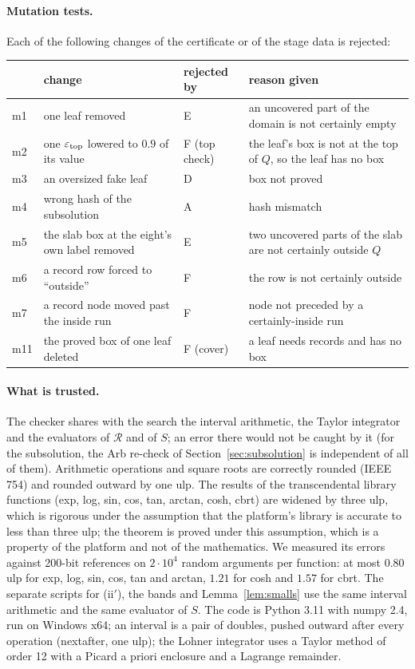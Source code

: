 \documentclass[11pt]{article}
\theoremstyle{definition}
\begin{document}
\paragraph{Mutation tests.} Each of the following changes of the certificate or of the stage data is rejected:
\begin{center}\footnotesize
\begin{tabular}{@{}lp{}lp{}@{}}\toprule
& change & rejected by & reason given \\ \midrule
m1 & one leaf removed & E & an uncovered part of the domain is not certainly empty \\
m2 & one $\varepsilon_{\rm top}$ lowered to $0.9$ of its value & F (top check) & the leaf's box is not at the top of $Q$, so the leaf has no box \\
m3 & an oversized fake leaf & D & box not proved \\
m4 & wrong hash of the subsolution & A & hash mismatch \\
m5 & the slab box at the eight's own label removed & E & two uncovered parts of the slab are not certainly outside $Q$ \\
m6 & a record row forced to ``outside'' & F & the row is not certainly outside \\
m7 & a record node moved past the inside run & F & node not preceded by a certainly-inside run \\
m11 & the proved box of one leaf deleted & F (cover) & a leaf needs records and has no box \\ \bottomrule
\end{tabular}
\end{center}

\paragraph{What is trusted.} The checker shares with the search the interval arithmetic, the Taylor integrator and the
evaluators of $\mathcal R$ and of $S$; an error there would not be caught by it (for the subsolution, the Arb re-check
of Section~\ref{sec:subsolution} is independent of all of them). Arithmetic operations and square roots are correctly
rounded (IEEE 754) and rounded outward by one ulp. The results of the transcendental library functions (exp, log, sin,
cos, tan, arctan, cosh, cbrt) are widened by three ulp, which is rigorous under the assumption that the platform's
library is accurate to less than three ulp; the theorem is proved under this assumption, which is a property of the
platform and not of the mathematics. We measured its errors against 200-bit references on $2\cdot10^4$ random
arguments per function: at most $0.80$ ulp for exp, log, sin, cos, tan and arctan, $1.21$ for cosh and $1.57$ for cbrt.
The separate scripts for (ii$'$), the bands and Lemma~\ref{lem:smalls} use the same interval arithmetic and the same
evaluator of $S$. The code is Python 3.11 with numpy 2.4, run on Windows x64; an interval is a pair of doubles, pushed
outward after every operation (nextafter, one ulp); the Lohner integrator uses a Taylor method of order 12 with a
Picard a priori enclosure and a Lagrange remainder.
\end{document}
